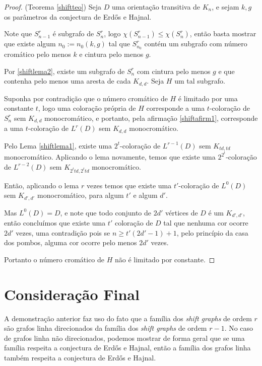 \begin{proof}(Teorema \ref{shiftteo})
Seja $D$ uma orientação transitiva de $K_n$, e sejam $k,g$ os parâmetros da conjectura de Erd\H{o}s e Hajnal. %

Note que $S_{n-1}^r$ é subgrafo de $S_n^r$, logo $\chi(S_{n-1}^r) \leq \chi(S_n^r)$, então basta mostrar que existe algum $n_0 := n_0(k,g)$ tal que $S_{n_0}^r$ contém um subgrafo com número cromático pelo menos $k$ e cintura pelo menos $g$.

Por \ref{shiftlema2}, existe um subgrafo de $S_n^r$ com cintura pelo menos $g$ e que contenha pelo menos uma aresta de cada $K_{d,d}$. Seja $H$ um tal subgrafo.

Suponha por contradição que o número cromático de $H$ é limitado por uma constante $t$, logo uma coloração própria de $H$ corresponde a uma $t$-coloração de $S_n^r$ sem $K_{d,d}$ monocromático, e portanto, pela afirmação \ref{shiftafirm1}, corresponde a uma $t$-coloração de $L^r(D)$ sem $K_{d,d}$ monocromático.

Pelo Lema \ref{shiftlema1}, existe uma $2^t$-coloração de $L^{r-1}(D)$ sem $K_{td,td}$ monocromático. Aplicando o lema novamente, temos que existe uma $2^{2^t}$-coloração de $L^{r-2}(D)$ sem $K_{2^ttd,2^ttd}$ monocromático.

Então, aplicando o lema $r$ vezes temos que existe uma $t'$-coloração de $L^0(D)$ sem $K_{d',d'}$ monocromático, para algum $t'$ e algum $d'$. 

Mas $L^0(D) = D$, e note que todo conjunto de $2d'$ vértices de $D$ é um $K_{d',d'}$, então concluímos que existe uma $t'$ coloração de $D$ tal que nenhuma cor ocorre $2d'$ vezes, uma contradição pois se $n \geq t'(2d'-1)+1$, pelo princípio da casa dos pombos, alguma cor ocorre pelo menos $2d'$ vezes.

Portanto o número cromático de $H$ não é limitado por constante.
\end{proof}

\section{Consideração Final}

A demonstração anterior faz uso do fato que a família dos \textit{shift graphs} de ordem $r$ são grafos linha direcionados da família dos \textit{shift graphs} de ordem $r-1$. No caso de grafos linha não direcionados, podemos mostrar de forma geral que se uma família respeita a conjectura de Erd\H{o}s e Hajnal, então a família dos grafos linha também respeita a conjectura de Erd\H{o}s e Hajnal.

